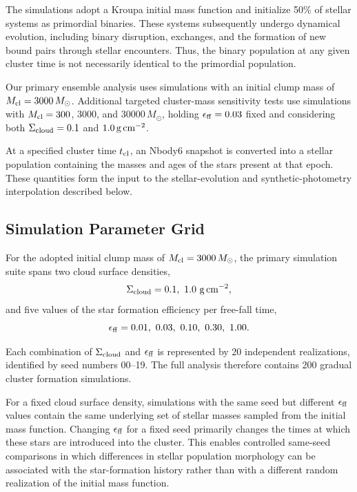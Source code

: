 \documentclass[linenumbers, twocolumn]{aastex631}
\begin{document}
The simulations adopt a Kroupa initial mass function and initialize 50\% of stellar systems as primordial binaries. These systems subsequently undergo dynamical evolution, including binary disruption, exchanges, and the formation of new bound pairs through stellar encounters. Thus, the binary population at any given cluster time is not necessarily identical to the primordial population.

Our primary ensemble analysis uses simulations with an initial clump mass of $M_{\rm cl}=3000\,M_\odot$. Additional targeted cluster-mass sensitivity tests use simulations with $M_{\rm cl}=300$, $3000$, and $30000\,M_\odot$, holding $\epsilon_{\rm ff}=0.03$ fixed and considering both $\Sigma_{\rm cloud}=0.1$ and $1.0\,{\rm g\,cm^{-2}}$.

At a specified cluster time $t_{\rm cl}$, an Nbody6 snapshot is converted into a stellar population containing the masses and ages of the stars present at that epoch. These quantities form the input to the stellar-evolution and synthetic-photometry interpolation described below.

\subsection{Simulation Parameter Grid}
\label{sec:simulation-grid}

For the adopted initial clump mass of $M_{\rm cl}=3000\,M_\odot$, the primary simulation suite spans two cloud surface densities,
\begin{equation}
\Sigma_{\rm cloud}
=
0.1,\ 1.0\ {\rm g\,cm^{-2}},
\end{equation}
and five values of the star formation efficiency per free-fall time,
\begin{equation}
\epsilon_{\rm ff}
=
0.01,\ 0.03,\ 0.10,\ 0.30,\ 1.00.
\end{equation}

Each combination of $\Sigma_{\rm cloud}$ and $\epsilon_{\rm ff}$ is represented by 20 independent realizations, identified by seed numbers 00--19. The full analysis therefore contains 200 gradual cluster formation simulations.

For a fixed cloud surface density, simulations with the same seed but different $\epsilon_{\rm ff}$ values contain the same underlying set of stellar masses sampled from the initial mass function. Changing $\epsilon_{\rm ff}$ for a fixed seed primarily changes the times at which these stars are introduced into the cluster. This enables controlled same-seed comparisons in which differences in stellar population morphology can be associated with the star-formation history rather than with a different random realization of the initial mass function.
\end{document}
